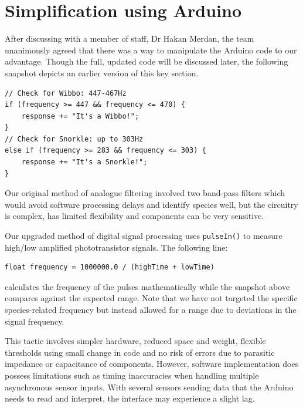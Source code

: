 \section{Simplification using Arduino}
After discussing with a member of staff, Dr Hakan Merdan, the team unanimously agreed that there was a way to manipulate the Arduino code to our advantage. Though the full, updated code will be discussed later, the following snapshot depicts an earlier version of this key section.
\begin{verbatim}
// Check for Wibbo: 447-467Hz
if (frequency >= 447 && frequency <= 470) {
    response += "It's a Wibbo!";
}
// Check for Snorkle: up to 303Hz
else if (frequency >= 283 && frequency <= 303) {
    response += "It's a Snorkle!";
}
\end{verbatim}
Our original method of analogue filtering involved two band-pass filters which would avoid software processing delays and identify species well, but the circuitry is complex, has limited flexibility and components can be very sensitive.

Our upgraded method of digital signal processing uses \texttt{pulseIn()} to measure high/low amplified phototransistor signals. The following line:
\begin{verbatim}
float frequency = 1000000.0 / (highTime + lowTime)
\end{verbatim}
calculates the frequency of the pulses mathematically while the snapshot above compares against the expected range. Note that we have not targeted the specific species-related frequency but instead allowed for a range due to deviations in the signal frequency.

This tactic involves simpler hardware, reduced space and weight, flexible thresholds using small change in code and no risk of errors due to parasitic impedance or capacitance of components. However, software implementation does possess limitations such as timing inaccuracies when handling multiple asynchronous sensor inputs. With several sensors sending data that the Arduino needs to read and interpret, the interface may experience a slight lag.

